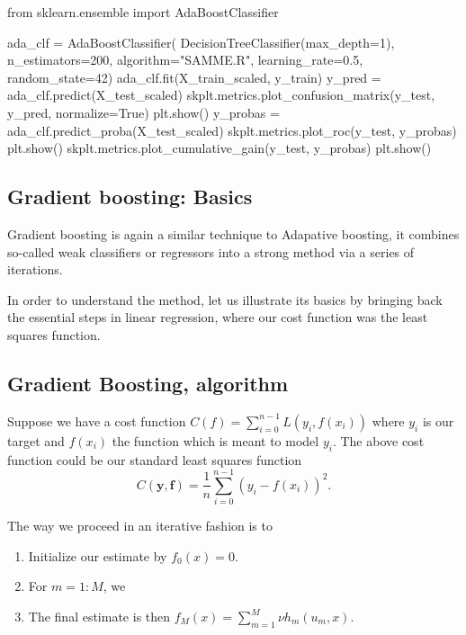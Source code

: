 \documentclass[%
oneside,                 %
final,                   %
10pt]{article}
\begin{document}
from sklearn.ensemble import AdaBoostClassifier

ada_clf = AdaBoostClassifier(
    DecisionTreeClassifier(max_depth=1), n_estimators=200,
    algorithm="SAMME.R", learning_rate=0.5, random_state=42)
ada_clf.fit(X_train_scaled, y_train)
y_pred = ada_clf.predict(X_test_scaled)
skplt.metrics.plot_confusion_matrix(y_test, y_pred, normalize=True)
plt.show()
y_probas = ada_clf.predict_proba(X_test_scaled)
skplt.metrics.plot_roc(y_test, y_probas)
plt.show()
skplt.metrics.plot_cumulative_gain(y_test, y_probas)
plt.show()
\epycod


\subsection{Gradient boosting: Basics}

Gradient boosting is again a similar technique to Adapative boosting,
it combines so-called weak classifiers or regressors into a strong
method via a series of iterations.

In order to understand the method, let us illustrate its basics by
bringing back the essential steps in linear regression, where our cost
function was the least squares function.

\subsection{Gradient Boosting, algorithm}

Suppose we have a cost function $C(f)=\sum_{i=0}^{n-1}L(y_i, f(x_i))$ where $y_i$ is our target and $f(x_i)$ the function which is meant to model $y_i$. The above cost function could be our standard least squares  function
\[
C(\bm{y},\bm{f})=\frac{1}{n}\sum_{i=0}^{n-1}(y_i-f(x_i))^2.
\]

The way we proceed in an iterative fashion is to
\begin{enumerate}
\item Initialize our estimate by $f_0(x)=0$.

\item For $m=1:M$, we

\noindent
\item The final estimate is then $f_M(x) = \sum_{m=1}^M\nu h_m(u_m,x)$.
\end{enumerate}
\end{document}
